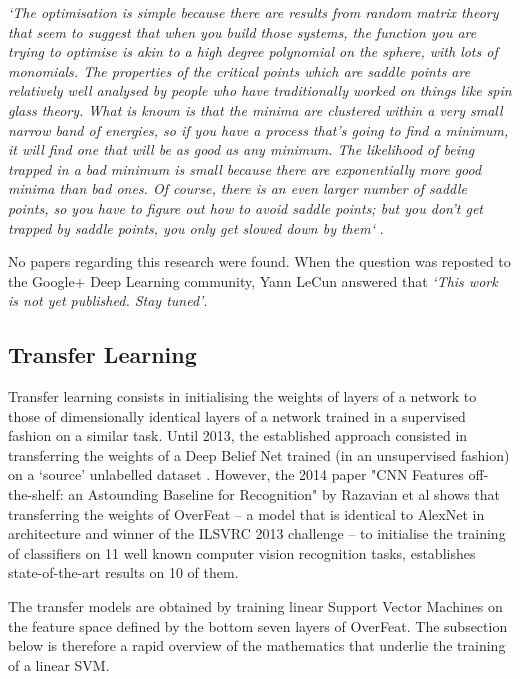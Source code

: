 \documentclass[a4paper,11pt]{article}
\begin{document}
\textit{`The optimisation is simple because there are results from random matrix theory that seem to suggest that when you build those systems, the function you are trying to optimise is akin to a high degree polynomial on the sphere, with lots of monomials. The properties of the critical points which are saddle points are relatively well analysed by people who have traditionally worked on things like spin glass theory. What is known is that the minima are clustered within a very small narrow band of energies, so if you have a process that's going to find a minimum, it will find one that will be as good as any minimum. The likelihood of being trapped in a bad minimum is small because there are exponentially more good minima than bad ones. Of course, there is an even larger number of saddle points, so you have to figure out how to avoid saddle points; but you don't get trapped by saddle points, you only get slowed down by them`} \cite{labex-bezout}.

No papers regarding this research were found. When the question was reposted to the Google+ Deep Learning community, Yann LeCun answered that \textit{`This work is not yet published. Stay tuned'}.


\subsection{Transfer Learning}

Transfer learning consists in initialising the weights of layers of a network to those of dimensionally identical layers of a network trained in a supervised fashion on a similar task. Until 2013, the established approach consisted in transferring the weights of a Deep Belief Net trained (in an unsupervised fashion) on a `source' unlabelled dataset \cite{microsoft-book}. However, the 2014 paper "CNN Features off-the-shelf: an Astounding Baseline for Recognition" by Razavian et al shows that transferring the weights of OverFeat -- a model that is identical to AlexNet in architecture and winner of the ILSVRC 2013 challenge \cite{transfer-learning} -- to initialise the training of classifiers on 11 well known computer vision recognition tasks, establishes state-of-the-art results on 10 of them\cite{off-the-shelf}.

The transfer models are obtained by training linear Support Vector Machines on the feature space defined by the bottom seven layers of OverFeat. The subsection below is therefore a rapid overview of the mathematics that underlie the training of a linear SVM. 
\end{document}
